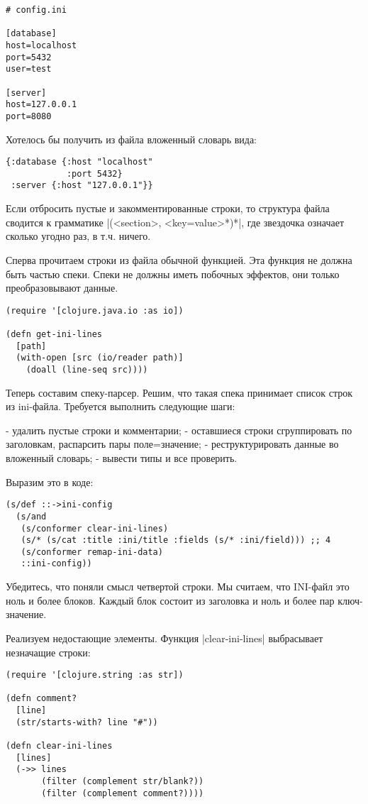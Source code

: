 \begin{verbatim}
# config.ini

[database]
host=localhost
port=5432
user=test

[server]
host=127.0.0.1
port=8080
\end{verbatim}

Хотелось бы получить из файла вложенный словарь вида:

\begin{verbatim}
{:database {:host "localhost"
            :port 5432}
 :server {:host "127.0.0.1"}}
\end{verbatim}

Если отбросить пустые и закомментированные строки, то структура файла сводится к
грамматике \spverb|(<section>, <key=value>*)*|, где звездочка означает сколько угодно
раз, в т.ч. ничего.

Сперва прочитаем строки из файла обычной функцией. Эта функция не должна быть
частью спеки. Спеки не должны иметь побочных эффектов, они только
преобразовывают данные.

\begin{verbatim}
(require '[clojure.java.io :as io])

(defn get-ini-lines
  [path]
  (with-open [src (io/reader path)]
    (doall (line-seq src))))
\end{verbatim}

Теперь составим спеку-парсер. Решим, что такая спека принимает список строк из
ini-файла. Требуется выполнить следующие шаги:

- удалить пустые строки и комментарии;
- оставшиеся строки сгруппировать по заголовкам, распарсить пары поле=значение;
- реструктурировать данные во вложенный словарь;
- вывести типы и все проверить.

Выразим это в коде:

\begin{verbatim}
(s/def ::->ini-config
  (s/and
   (s/conformer clear-ini-lines)
   (s/* (s/cat :title :ini/title :fields (s/* :ini/field))) ;; 4
   (s/conformer remap-ini-data)
   ::ini-config))
\end{verbatim}

Убедитесь, что поняли смысл четвертой строки. Мы считаем, что INI-файл это ноль
и более блоков. Каждый блок состоит из заголовка и ноль и более пар
ключ-значение.

Реализуем недостающие элементы. Функция \spverb|clear-ini-lines| выбрасывает незначащие
строки:

\begin{verbatim}
(require '[clojure.string :as str])

(defn comment?
  [line]
  (str/starts-with? line "#"))

(defn clear-ini-lines
  [lines]
  (->> lines
       (filter (complement str/blank?))
       (filter (complement comment?))))
\end{verbatim}

